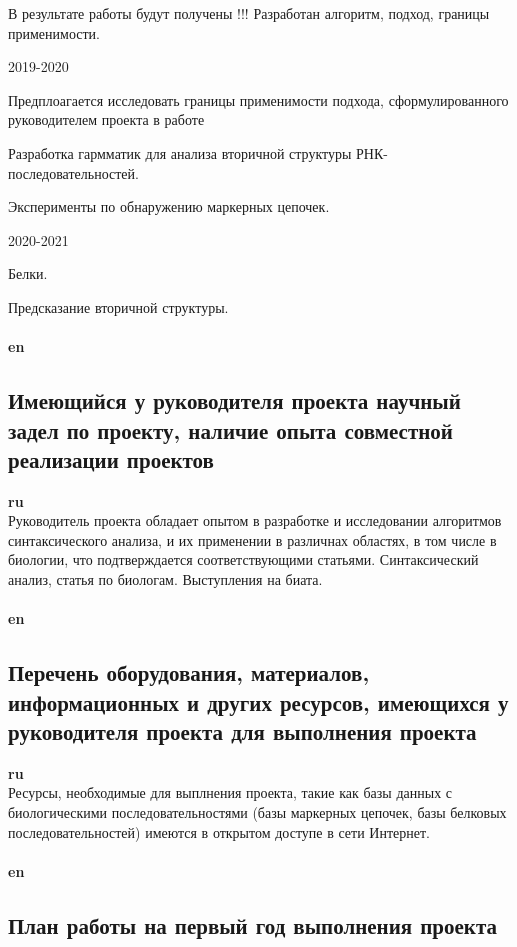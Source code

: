 \documentclass[12pt]{article}  %
\theoremstyle{remark}
\begin{document}
В результате работы будут получены !!! Разработан алгоритм, подход, границы применимости. 

2019-2020

Предплоагается исследовать границы применимости подхода, сформулированного руководителем проекта в работе 

Разработка гармматик для анализа вторичной структуры РНК-последовательностей.

Эксперименты по обнаружению маркерных цепочек.


2020-2021

Белки.

Предсказание вторичной структуры.
\\
\\
\textbf{en}\\


\subsection{Имеющийся у руководителя проекта научный задел по проекту, наличие опыта совместной реализации проектов}

\textbf{ru}\\
Руководитель проекта обладает опытом в разработке и исследовании алгоритмов синтаксического анализа, и их применении в различнах областях, в том числе в биологии, что подтверждается соответствующими статьями.
Синтаксический анализ, статья по биологам. Выступления на биата.
\\
\\
\textbf{en}\\


\subsection{Перечень оборудования, материалов, информационных и других ресурсов, имеющихся у руководителя проекта для выполнения проекта }
\textbf{ru}\\
Ресурсы, необходимые для выплнения проекта, такие как базы данных с биологическими последовательностями (базы маркерных цепочек, базы белковых последовательностей) имеются в открытом доступе в сети Интернет.
\\
\\
\textbf{en}\\


\subsection{План работы на первый год выполнения проекта}
\end{document}
